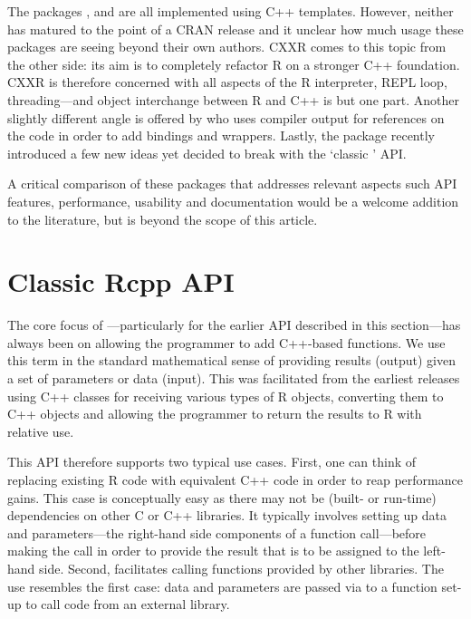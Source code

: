 The packages  \citep{liang08:rcppbind}, 
\citep{armstrong09:RAbstraction} and 
\citep{armstrong09:RObjects} are all implemented using C++ templates.
However, neither has matured to the point of a CRAN release and it
unclear how much usage these packages are seeing beyond their own authors.
%
CXXR \citep{runnalls09:cxxr} comes to this topic from the other side: 
its aim is to completely refactor R on a stronger C++ foundation. 
CXXR is therefore concerned with all aspects of the R interpreter,
REPL loop, threading---and object interchange between R and C++ is but one part.
%
Another slightly different angle is offered by
\cite{templelang09:rgcctranslationunit} who uses compiler output for
references on the code in order to add bindings and wrappers.
%
Lastly, the  package \citep{samperi09:rcpptemplate}
recently introduced a few new ideas yet decided to break with the
`classic ' API.

A critical comparison of these packages that addresses relevant aspects such
API features, performance, usability and documentation would be a welcome
addition to the literature, but is beyond the scope of this article.

\section{Classic Rcpp API}
\label{sec:classic_rcpp}

The core focus of ---particularly for the earlier API described in
this section---has always been on allowing the programmer to add C++-based
functions. We use this term in the standard mathematical sense of providing
results (output) given a set of parameters or data (input). This was
facilitated from the earliest releases using C++ classes for receiving
various types of R objects, converting them to C++ objects and allowing the
programmer to return the results to R with relative use. 

This API therefore supports two typical use cases. First, one can think of
replacing existing R code with equivalent C++ code in order to reap
performance gains.  This case is conceptually easy as there may not be
(built- or run-time) dependencies on other C or C++ libraries.  It typically
involves setting up data and parameters---the right-hand side components of a
function call---before making the call in order to provide the result that is
to be assigned to the left-hand side. Second,  facilitates calling
functions provided by other libraries. The use resembles the first case: data
and parameters are passed via  to a function set-up to call code
from an external library.  

